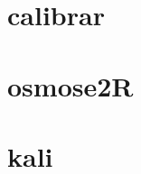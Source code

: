\lipsum[1-2]

\section{calibrar}
\lipsum[3]

\section{osmose2R}
\lipsum[4]

\section{kali}
\lipsum[5]

